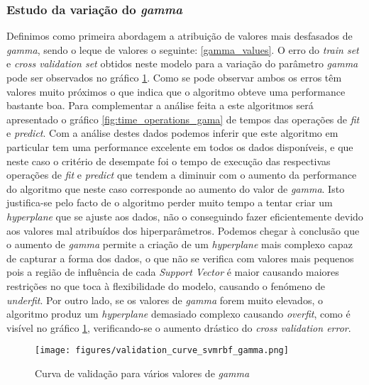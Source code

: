 \subsubsection{Estudo da variação do \textit{gamma}}
Definimos como primeira abordagem a atribuição de valores mais desfasados de \textit{gamma}, sendo o leque de valores o seguinte: \ref{gamma_values}.\newline
O erro do \textit{train set} e \textit{cross validation set} obtidos neste modelo para a variação do parâmetro \textit{gamma} pode ser observados no gráfico \ref{fig:model_gamma}.
Como se pode observar ambos os erros têm valores muito próximos o que indica que o algoritmo obteve uma performance bastante boa.\newline
Para complementar a análise feita a este algoritmos será apresentado o  gráfico \ref{fig:time_operations_gama} de tempos das operações de \textit{fit} e \textit{predict}.\newline
Com a análise destes dados podemos inferir que este algoritmo em particular tem uma performance excelente em todos os dados disponíveis, e que neste caso o critério de desempate foi o tempo de execução das respectivas operações de \textit{fit} e \textit{predict} que tendem a diminuir com o aumento da performance do algoritmo que neste caso corresponde ao aumento do valor de \textit{gamma}. Isto justifica-se pelo facto de o algoritmo perder muito tempo a tentar criar um \textit{hyperplane} que se ajuste aos dados, não o conseguindo fazer eficientemente devido aos valores mal atribuídos dos hiperparâmetros.
Podemos chegar à conclusão que o aumento de \textit{gamma} permite a criação de um \textit{hyperplane} mais complexo capaz de capturar a forma dos dados, o que não se verifica com valores mais pequenos pois a região de influência de cada \textit{Support Vector} é maior causando maiores restrições no que toca à flexibilidade do modelo, causando o fenómeno de \textit{underfit}.
Por outro lado, se os valores de \textit{gamma} forem muito elevados, o algoritmo produz um \textit{hyperplane} demasiado complexo causando \textit{overfit}, como é visível no gráfico \ref{fig:model_gamma}, verificando-se o aumento drástico do \textit{cross validation error}.


\begin{figure}[htp]
\centering
\texttt{[image: figures/validation\_curve\_svmrbf\_gamma.png]}
\caption{Curva de validação para vários valores de \textit{gamma}}
\label{fig:model_gamma}
\end{figure}

